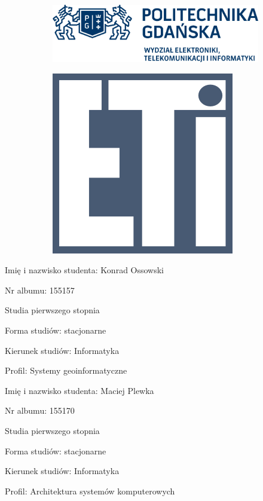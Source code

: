 \thispagestyle{empty}
\begin{figure}
\centering
\begin{subfigure}{.5\textwidth}
  \includegraphics[scale=0.3,left]{imgs/pg_logo.png}
\end{subfigure}%
\begin{subfigure}{.5\textwidth}
  \includegraphics[scale=0.3,right]{imgs/eti.png}
\end{subfigure}
\end{figure}

\vspace*{10mm}

\begin{multicols}{2}
\begin{flushleft}
Imię i nazwisko studenta: Konrad Ossowski

Nr albumu: 155157

Studia pierwszego stopnia

Forma studiów: stacjonarne

Kierunek studiów: Informatyka

Profil: Systemy geoinformatyczne
 \end{flushleft}
\columnbreak
 \begin{flushleft}
Imię i nazwisko studenta: Maciej Plewka

Nr albumu: 155170

Studia pierwszego stopnia

Forma studiów: stacjonarne

Kierunek studiów: Informatyka

Profil: Architektura systemów komputerowych
\end{flushleft}
\end{multicols}

